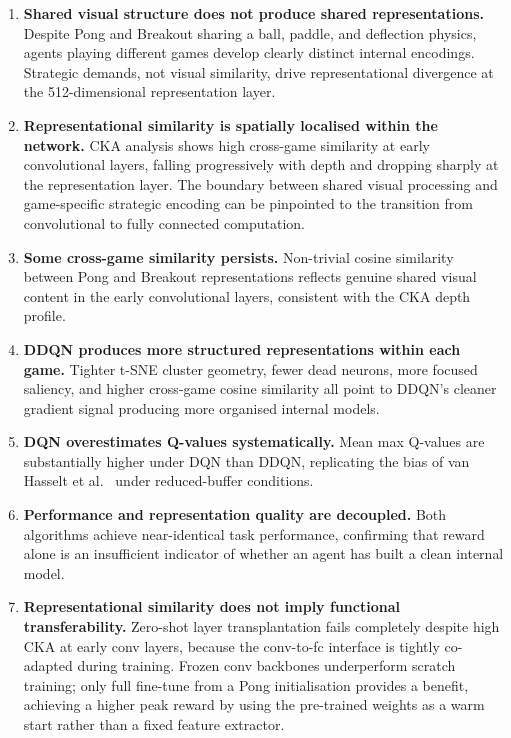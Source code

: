 \documentclass[a4paper]{article}
\begin{document}
\begin{enumerate}
    \item \textbf{Shared visual structure does not produce shared representations.} Despite Pong and Breakout sharing a ball, paddle, and deflection physics, agents playing different games develop clearly distinct internal encodings. Strategic demands, not visual similarity, drive representational divergence at the 512-dimensional representation layer.
    \item \textbf{Representational similarity is spatially localised within the network.} CKA analysis shows high cross-game similarity at early convolutional layers, falling progressively with depth and dropping sharply at the representation layer. The boundary between shared visual processing and game-specific strategic encoding can be pinpointed to the transition from convolutional to fully connected computation.
    \item \textbf{Some cross-game similarity persists.} Non-trivial cosine similarity between Pong and Breakout representations reflects genuine shared visual content in the early convolutional layers, consistent with the CKA depth profile.
    \item \textbf{DDQN produces more structured representations within each game.} Tighter t-SNE cluster geometry, fewer dead neurons, more focused saliency, and higher cross-game cosine similarity all point to DDQN's cleaner gradient signal producing more organised internal models.
    \item \textbf{DQN overestimates Q-values systematically.} Mean max Q-values are substantially higher under DQN than DDQN, replicating the bias of van Hasselt et al.\ \cite{van2016deep} under reduced-buffer conditions.
    \item \textbf{Performance and representation quality are decoupled.} Both algorithms achieve near-identical task performance, confirming that reward alone is an insufficient indicator of whether an agent has built a clean internal model.
    \item \textbf{Representational similarity does not imply functional transferability.} Zero-shot layer transplantation fails completely despite high CKA at early conv layers, because the conv-to-fc interface is tightly co-adapted during training. Frozen conv backbones underperform scratch training; only full fine-tune from a Pong initialisation provides a benefit, achieving a higher peak reward by using the pre-trained weights as a warm start rather than a fixed feature extractor.
\end{enumerate}
\end{document}
